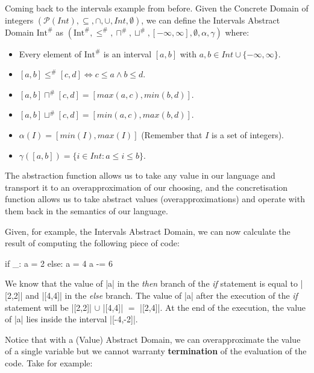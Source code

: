 Coming back to the intervals example from before. Given the Concrete
Domain of integers
\((\mathcal{P}(Int), \subseteq, \cap, \cup, Int, \emptyset)\), we can
define the Intervals Abstract Domain \(\text{Int}^{\#}\) as
\((\text{Int}^{\#}, \le^{\#}, \sqcap^{\#}, \sqcup^{\#}, [-\infty,\infty], \emptyset, \alpha, \gamma)\)
where:

\begin{itemize}
\tightlist
\item Every element of \(\text{Int}^{\#}\) is an interval \([a, b]\) with
  \(a, b \in Int \cup \{-\infty,\infty\}\).
\item \([a, b] \le^{\#} [c, d] \iff c \le a \wedge b \le d\).
\item \([a, b] \sqcap^{\#} [c, d] = [max(a,c), min(b, d)]\).
\item \([a, b] \sqcup^{\#} [c, d] = [min(a,c), max(b, d)]\).
\item \(\alpha(I) = [min(I), max(I)]\) (Remember that \(I\) is a set of integers).
\item \(\gamma([a, b]) = \{i \in Int : a \le i \le b\}\).
\end{itemize}

The abstraction function allows us to take any value
in our language and transport it to an overapproximation of our
choosing, and the concretisation function allows us to take abstract
values (overapproximations) and operate with them back in the semantics
of our language.

Given, for example, the Intervals Abstract Domain, we can now calculate
the result of computing the following piece of code:

\begin{pythoncode}
if _:
  a = 2
else:
  a = 4
a -= 6
\end{pythoncode}

We know that the value of \pycode|a| in the \emph{then} branch of the
\emph{if} statement is equal to \pycode|[2,2]| and
\pycode|[4,4]| in the \emph{else} branch. The value of \pycode|a|
after the execution of the \emph{if} statement will be
\pycode|[2,2]| \(\cup{}\) \pycode|[4,4]| \(=\)
\pycode|[2,4]|. At the end of the execution, the value of \pycode|a|
lies inside the interval \pycode|[-4,-2]|.

Notice that with a (Value) Abstract Domain, we can overapproximate the
value of a single variable but we cannot warranty \textbf{termination}
of the evaluation of the code. Take for example:

